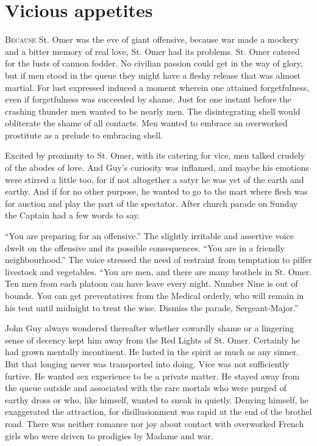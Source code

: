 \chapter*{\textsf{Vicious appetites}}

B\textsc{ecause} St. Omer was the eve of giant offensive, because war made a mockery  and a bitter memory of real love, St. Omer had its problems. St. Omer catered for the lusts of cannon fodder. No civilian passion could get in the way of glory, but if men stood in the queue they might have a fleshy release that was almost martial. For lust expressed induced a moment wherein one attained forgetfulness, even if forgetfulness was succeeded by shame. Just for one instant before the crashing thunder men wanted to be nearly men. The disintegrating shell would obliterate the shame of all contacts. Men wanted to embrace an overworked prostitute as a prelude to embracing shell.

Excited by proximity to St. Omer, with its catering for vice, men talked crudely of the abodes of love. And Guy's curiosity was inflamed, and maybe his emotions were stirred a little too, for if not altogether a satyr he was yet of the earth and earthy. And if for no other purpose, he wanted to go to the mart where flesh was for auction and play the part of the spectator. After church parade on Sunday the Captain had a few words to say.

``You are preparing for an offensive.'' The slightly irritable and assertive voice dwelt on the offensive and its possible consequences. ``You are in a friendly neighbourhood.'' The voice stressed the need of restraint from temptation to pilfer livestock and vegetables. ``You are men, and there are many brothels in St. Omer. Ten men from each platoon can have leave every night. Number Nine is out of bounds. You can get preventatives from the Medical orderly, who will remain in his tent until midnight to treat the wise. Dismiss the parade, Sergeant-Major.''

John Guy always wondered thereafter whether cowardly shame or a lingering sense of decency kept him away from the Red Lights of St. Omer. Certainly he had grown mentally incontinent. He lusted in the spirit as much as any sinner. But that longing never was transported into doing. Vice was not sufficiently furtive. He wanted sex experience to be a private matter. He stayed away from the queue outside and associated with the rare mortals who were purged of earthy dross or who, like himself, wanted to sneak in quietly. Denying himself, he exaggerated the attraction, for disillusionment was rapid at the end of the brothel road. There was neither romance nor joy about contact with overworked French girls who were driven to prodigies by Madame and war.

